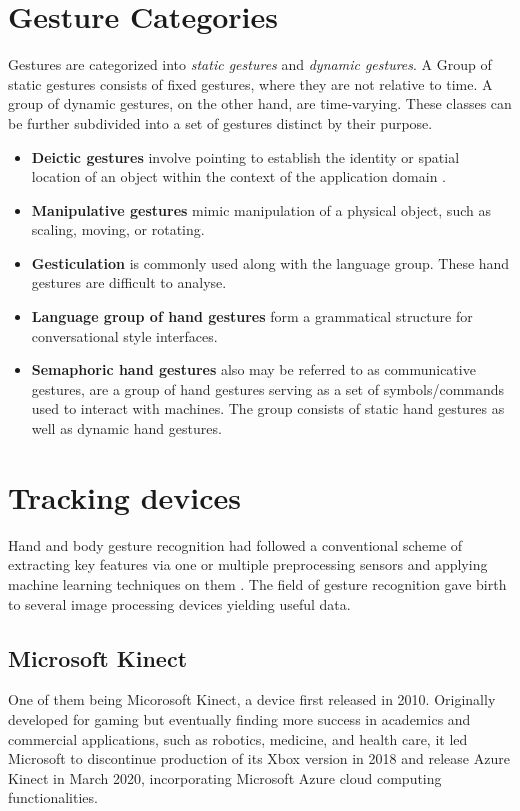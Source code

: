 
\section{Gesture Categories}
Gestures are categorized into \textit{static gestures} and \textit{dynamic gestures}. A Group of static gestures consists of fixed gestures, where they are not relative to time. A group of dynamic gestures, on the other hand, are time-varying. These classes can be further subdivided into a set of gestures distinct by their purpose.


\begin{itemize}
	\item \textbf{Deictic gestures} involve pointing to establish the identity or spatial location of an object within the context of the application domain \cite{taxonomi}.
    \item \textbf{Manipulative gestures} mimic manipulation of a physical object, such as scaling, moving, or rotating.
    \item \textbf{Gesticulation} is commonly used along with the language group. These hand gestures are difficult to analyse.
	\item \textbf{Language group of hand gestures} form a grammatical structure for conversational style interfaces.
    \item \textbf{Semaphoric hand gestures} also may be referred to as communicative gestures, are a group of hand gestures serving as a set of symbols/commands used to interact with machines. The group consists of static hand gestures as well as dynamic hand gestures. 
\end{itemize}


\section{Tracking devices}
Hand and body gesture recognition had followed a conventional scheme of extracting key features via one or multiple preprocessing sensors and applying machine learning techniques on them \cite{avola}. The field of gesture recognition gave birth to several image processing devices yielding useful data. 
\subsection{Microsoft Kinect}
One of them being Micorosoft Kinect, a device first released in 2010. Originally developed for gaming but eventually finding more success in academics and commercial applications, such as robotics, medicine, and health care, it led Microsoft to discontinue production of its Xbox version in 2018 and release Azure Kinect in March 2020, incorporating Microsoft Azure cloud computing functionalities.

